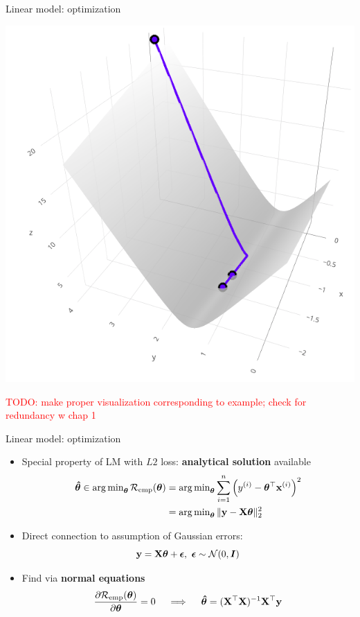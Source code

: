 \documentclass[11pt,compress,t,notes=noshow, xcolor=table]{beamer}
\begin{document}
\begin{frame}{Linear model: optimization}
\begin{minipage}{0.5\textwidth}
    \includegraphics[width=\textwidth]{figure/ss_surf.png}
\end{minipage}

\vfill
\textcolor{red}{TODO: make proper visualization corresponding to example; check 
for redundancy w chap 1}

\end{frame}


\begin{vbframe}{Linear model: optimization}

\begin{itemize}
    \item Special property of LM with $L2$ loss: \textbf{analytical solution}
    available
    \begin{align*}
        \bm{\hat\theta} \in 
        \operatorname{arg\,min}_{\bm{\theta}} \mathcal{R}_{\text{emp}}(\bm{\theta}) &=
        \operatorname{arg\,min}_{\bm{\theta}} \sum\limits_{i=1}^n \left(y^{(i)} - \bm{\theta}^\top \mathbf{x}^{(i)} \right)^2  \\
        &= \operatorname{arg\,min}_{\bm{\theta}} \| \mathbf{y} - \mathbf{X} \bm{\theta} \|^2_2
    \end{align*}
    \normalsize
    \item Direct connection to assumption of 
    Gaussian errors: $$\mathbf{y} = \mathbf{X} \bm{\theta} + \bm{\epsilon}, ~ \bm{\epsilon} \sim 
    \mathcal{N}(0, \boldsymbol{I})$$
    \item Find via \textbf{normal equations}
    $$
    \frac{\partial{\mathcal{R}_{\text{emp}}(\bm{\theta})}}{\partial \bm{\theta}} = 0 \quad\implies\quad \bm{\hat\theta} = (\mathbf{X}^\top \mathbf{X})^{-1} \mathbf{X}^\top \mathbf{y}
    $$
\end{itemize}

\end{vbframe}


\endlecture
\end{document}
